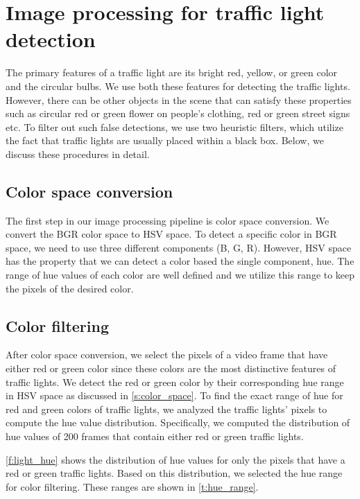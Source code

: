 \section{Image processing for traffic light detection}
The primary features of a traffic light are its bright red, yellow, or green color and the circular bulbs.
We use both these features for detecting the traffic lights. 
However, there can be other objects in the scene that can satisfy these properties such as circular red or green flower on people's clothing, red or green street signs etc.
To filter out such false detections, we use two heuristic filters, which utilize the fact that traffic lights are usually placed within a black box. 
Below, we discuss these procedures in detail.



\subsection{Color space conversion}
The first step in our image processing pipeline is color space conversion.
We convert the BGR color space to HSV space.
To detect a specific color in BGR space, we need to use three different components (B, G, R).
However, HSV space has the property that we can detect a color based the single component, hue.
The range of hue values of each color are well defined and we utilize this range to keep the pixels of the desired color.


\subsection{Color filtering}
After color space conversion, we select the pixels of a video frame that have either red or green color since these colors are the most distinctive features of traffic lights.
We detect the red or green color by their corresponding hue range in HSV space as discussed in \ref{s:color_space}. 
To find the exact range of hue for red and green colors of traffic lights, we analyzed the traffic lights' pixels to compute the hue value distribution.
Specifically, we computed the distribution of hue values of 200 frames that contain either red or green traffic lights. 

\ref{f:light_hue} shows the distribution of hue values for only the pixels that have a red or green traffic lights.
Based on this distribution, we selected the hue range for color filtering. 
These ranges are shown in \ref{t:hue_range}.


